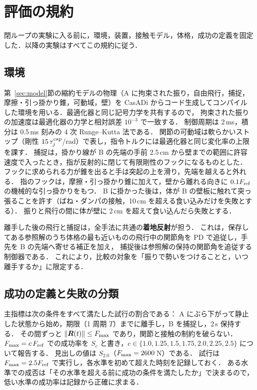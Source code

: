 \section{評価の規約}
\label{sec:protocol}
閉ループの実験に入る前に，環境，装置，接触モデル，体格，成功の定義を固定した．以降の実験はすべてこの規約に従う．

\subsection{環境}
第~\ref{sec:model}節の縮約モデルの物理（A に拘束された振り，自由飛行，捕捉，摩擦・引っ掛かり錐，可動域，壁）を
CasADi からコード生成してコンパイルした環境を用いる．最適化器と同じ記号力学を共有するので，
拘束された振りの加速度は最適化器の力学と相対誤差 $10^{-3}$ で一致する．
制御周期は 2\,ms，積分は 0.5\,ms 刻みの 4 次 Runge--Kutta 法である．
関節の可動域は軟らかいストップ（剛性 $15\,\tau^{\mathrm{cap}}_j$/rad）で表し，指令トルクには最適化器と同じ変化率の上限を課す．
捕捉は，掛かり線が B の先端の手前 2.5\,cm から壁までの範囲に許容速度で入ったとき，指が反射的に閉じて有限剛性のフックになるものとした．
フックに求められる力が錐を出ると手は突起の上を滑り，先端を越えると外れる．
指のフックは，摩擦・引っ掛かり錐に加えて，壁から離れる向きに $0.1F_{\mathrm{ref}}$ の機械的な引っ掛かりをもつ．
B に掛かった後は，体が B の壁板に触れて突っ張ることを許す（ばね・ダンパの接触，10\,cm を超える食い込みだけを失敗とする）．
振りと飛行の間に体が壁に 2\,cm を超えて食い込んだら失敗とする．

離手した後の飛行と捕捉は，全手法に共通の\textbf{着地反射}が担う．
これは，保存してある参照解のうち体格の最も近いものの飛行中の関節角を PD で追従し，手先を B の先端へ寄せる補正を加え，
捕捉後は参照解の保持の関節角を追従する制御器である．
これにより，比較の対象を「振りで勢いをつけることと，いつ離手するか」に限定する．

\subsection{成功の定義と失敗の分類}
主指標は次の条件をすべて満たした試行の割合である：
A にぶら下がって静止した状態から始め，期限（1 周期 $T$）までに離手し，B を捕捉し，2\,s 保持する．
その間ずっと $\|\bm R(t)\|\le F_{\max}$ であり，関節と接触の制約を破らない．
$F_{\max}=c\,F_{\mathrm{ref}}$ での成功率を $S_c$ と書き，$c\in\{1.0,1.25,1.5,1.75,2.0,2.25,2.5\}$ について報告する．
見出しの値は $S_{2.0}$（$F_{\max}=2600$\,N）である．
試行は $F_{\max}=2.5F_{\mathrm{ref}}$ で実行し，各水準を初めて超えた時刻を記録しておく．
ある水準での成否は「その水準を超える前に成功の条件を満たしたか」で決まるので，低い水準の成功率は記録から正確に求まる．

